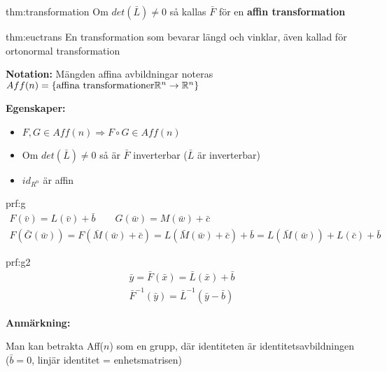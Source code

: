 \par\bigskip
\begin{theo}{thm:transformation}
  Om $det(\bar{L}) \neq 0$ så kallas $\bar{F}$ för en \textbf{affin transformation}
\end{theo}
\par\bigskip
\begin{theo}{thm:euctrans}
  En transformation som bevarar längd och vinklar, även kallad för ortonormal transformation
\end{theo}
\par\bigskip
\noindent\textbf{Notation:} Mängden affina avbildningar noteras $Aff(n) = \{\text{affina transformationer} \mathbb{R}^n\to\mathbb{R}^n\}$
\par\bigskip
\noindent\textbf{Egenskaper:}
\begin{itemize}
  \item $F,G\in Aff(n)\Rightarrow F\circ G\in Aff(n)$
  \item Om $det(\bar{L})\neq0$ så är $\bar{F}$ inverterbar ($\bar{L}$ är inverterbar)
  \item $id_{R^n}$ är affin 
\end{itemize}
\par\bigskip
\begin{prf}[Egenskap 1]{prf:g}
  \begin{equation*}
    \begin{gathered}
      F(\bar{v}) = L(\bar{v})+\bar{b}\qquad G(\bar{w}) = M(\bar{w})+\bar{c}\\
      F(\bar{G}(\bar{w})) = F(\bar{M}(\bar{w})+\bar{c})=L(\bar{M}(\bar{w})+\bar{c})+\bar{b} = L(\bar{M}(\bar{w}))+L(\bar{c})+\bar{b}
    \end{gathered}
  \end{equation*}
\end{prf}
\newpage
\begin{prf}[Egenskap 2]{prf:g2}
  \begin{equation*}
    \begin{gathered}
      \bar{y} = \bar{F}(\bar{x}) = \bar{L}(\bar{x})+\bar{b}\\
      \bar{F}^{-1}(\bar{y}) = \bar{L}^{-1}(\bar{y}-\bar{b})
    \end{gathered}
  \end{equation*}
\end{prf}
\par\bigskip
\noindent\textbf{Anmärkning:}\par
\noindent Man kan betrakta Aff($n$) som en grupp, där identiteten är identitetsavbildningen ($\bar{b} = 0$, linjär identitet = enhetsmatrisen)
